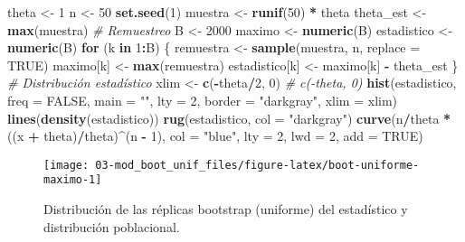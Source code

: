 \documentclass[
]{book}
\newenvironment{Shaded}{\begin{snugshade}}{\end{snugshade}}
\newcommand{\CommentTok}[1]{\textcolor[rgb]{0.56,0.35,0.01}{\textit{#1}}}
\newcommand{\ControlFlowTok}[1]{\textcolor[rgb]{0.13,0.29,0.53}{\textbf{#1}}}
\newcommand{\DataTypeTok}[1]{\textcolor[rgb]{0.13,0.29,0.53}{#1}}
\newcommand{\DecValTok}[1]{\textcolor[rgb]{0.00,0.00,0.81}{#1}}
\newcommand{\KeywordTok}[1]{\textcolor[rgb]{0.13,0.29,0.53}{\textbf{#1}}}
\newcommand{\NormalTok}[1]{#1}
\newcommand{\OperatorTok}[1]{\textcolor[rgb]{0.81,0.36,0.00}{\textbf{#1}}}
\newcommand{\OtherTok}[1]{\textcolor[rgb]{0.56,0.35,0.01}{#1}}
\newcommand{\StringTok}[1]{\textcolor[rgb]{0.31,0.60,0.02}{#1}}
\theoremstyle{break}
\theoremstyle{definition}
\theoremstyle{definition}
\theoremstyle{definition}
\theoremstyle{remark}
\begin{document}
\begin{Shaded}
\begin{Highlighting}[]
\NormalTok{theta <-}\StringTok{ }\DecValTok{1}
\NormalTok{n <-}\StringTok{ }\DecValTok{50}
\KeywordTok{set.seed}\NormalTok{(}\DecValTok{1}\NormalTok{)}
\NormalTok{muestra <-}\StringTok{ }\KeywordTok{runif}\NormalTok{(}\DecValTok{50}\NormalTok{) }\OperatorTok{*}\StringTok{ }\NormalTok{theta}
\NormalTok{theta_est <-}\StringTok{ }\KeywordTok{max}\NormalTok{(muestra)}
\CommentTok{# Remuestreo}
\NormalTok{B <-}\StringTok{ }\DecValTok{2000}
\NormalTok{maximo <-}\StringTok{ }\KeywordTok{numeric}\NormalTok{(B)}
\NormalTok{estadistico <-}\StringTok{ }\KeywordTok{numeric}\NormalTok{(B)}
\ControlFlowTok{for}\NormalTok{ (k }\ControlFlowTok{in} \DecValTok{1}\OperatorTok{:}\NormalTok{B) \{}
\NormalTok{    remuestra <-}\StringTok{ }\KeywordTok{sample}\NormalTok{(muestra, n, }\DataTypeTok{replace =} \OtherTok{TRUE}\NormalTok{)}
\NormalTok{    maximo[k] <-}\StringTok{ }\KeywordTok{max}\NormalTok{(remuestra)}
\NormalTok{    estadistico[k] <-}\StringTok{ }\NormalTok{maximo[k] }\OperatorTok{-}\StringTok{ }\NormalTok{theta_est}
\NormalTok{\}}
\CommentTok{# Distribución estadístico}
\NormalTok{xlim <-}\StringTok{ }\KeywordTok{c}\NormalTok{(}\OperatorTok{-}\NormalTok{theta}\OperatorTok{/}\DecValTok{2}\NormalTok{, }\DecValTok{0}\NormalTok{) }\CommentTok{# c(-theta, 0)}
\KeywordTok{hist}\NormalTok{(estadistico, }\DataTypeTok{freq =} \OtherTok{FALSE}\NormalTok{, }\DataTypeTok{main =} \StringTok{""}\NormalTok{, }\DataTypeTok{lty =} \DecValTok{2}\NormalTok{, }
     \DataTypeTok{border =} \StringTok{"darkgray"}\NormalTok{, }\DataTypeTok{xlim =}\NormalTok{ xlim)}
\KeywordTok{lines}\NormalTok{(}\KeywordTok{density}\NormalTok{(estadistico))}
\KeywordTok{rug}\NormalTok{(estadistico, }\DataTypeTok{col =} \StringTok{"darkgray"}\NormalTok{)}
\KeywordTok{curve}\NormalTok{(n}\OperatorTok{/}\NormalTok{theta }\OperatorTok{*}\StringTok{ }\NormalTok{((x }\OperatorTok{+}\StringTok{ }\NormalTok{theta)}\OperatorTok{/}\NormalTok{theta)}\OperatorTok{^}\NormalTok{(n }\OperatorTok{-}\StringTok{ }\DecValTok{1}\NormalTok{), }\DataTypeTok{col =} \StringTok{"blue"}\NormalTok{, }\DataTypeTok{lty =} \DecValTok{2}\NormalTok{, }\DataTypeTok{lwd =} \DecValTok{2}\NormalTok{, }\DataTypeTok{add =} \OtherTok{TRUE}\NormalTok{)}
\end{Highlighting}
\end{Shaded}

\begin{figure}[!htb]

{\centering \texttt{[image: 03-mod\_boot\_unif\_files/figure-latex/boot-uniforme-maximo-1]} 

}

\caption{Distribución de las réplicas bootstrap (uniforme) del estadístico y distribución poblacional.}\label{fig:boot-uniforme-maximo}
\end{figure}
\end{document}
